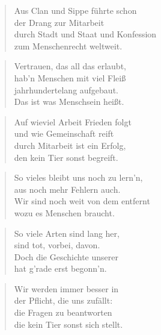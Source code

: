 \documentclass[10pt,a4paper]{article}
\begin{document}
\begin{multicols}{2}
\begin{verse}
Aus Clan und Sippe führte schon \\
der Drang zur Mitarbeit \\
durch Stadt und Staat und Konfession \\
zum Menschenrecht weltweit. \\
\end{verse}

\begin{verse}
Vertrauen, das all das erlaubt, \\
hab’n Menschen mit viel Fleiß \\
jahrhundertelang aufgebaut. \\
Das ist was Menschsein heißt. \\
\end{verse}

\begin{verse}
Auf wieviel Arbeit Frieden folgt \\
und wie Gemeinschaft reift \\
durch Mitarbeit ist ein Erfolg, \\
den kein Tier sonst begreift. \\
\end{verse}

\begin{verse}
So vieles bleibt uns noch zu lern’n, \\
aus noch mehr Fehlern auch. \\
Wir sind noch weit von dem entfernt \\
wozu es Menschen braucht. \\
\end{verse}

\begin{verse}
So viele Arten sind lang her, \\
sind tot, vorbei, davon. \\
Doch die Geschichte unserer \\
hat g’rade erst begonn’n. \\
\end{verse}

\begin{verse}
Wir werden immer besser in \\
der Pflicht, die uns zufällt: \\
die Fragen zu beantworten \\
die kein Tier sonst sich stellt. \\
\end{verse}


\end{multicols}
\end{document}
